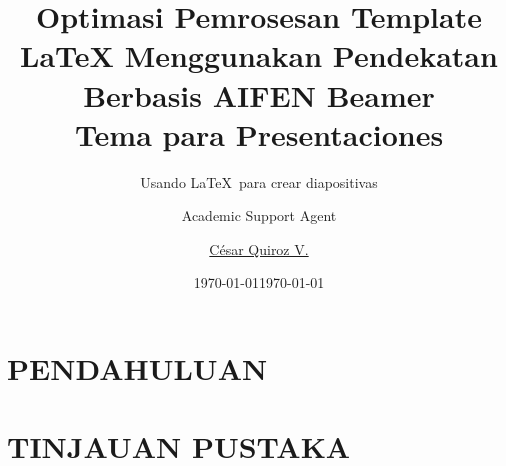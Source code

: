 \documentclass{sintefbeamer}
\title{Optimasi Pemrosesan Template LaTeX Menggunakan Pendekatan Berbasis AI}
\author{Academic Support Agent}
\date{\today}
\begin{document}
\maketitle

\begin{abstract}

\end{abstract}

\chapter{PENDAHULUAN}


\chapter{TINJAUAN PUSTAKA}


\newcommand{\testcolor}[1]{\colorbox{#1}{\textcolor{#1}{test}}~\texttt{#1}}

\title{FEN Beamer\\ Tema para Presentaciones}
\subtitle{Usando \LaTeX\ para crear diapositivas}
\author{\href{mailto:cquirozv@fen.uchile.cl}{César Quiroz V.}}
\date{\today}
\end{document}
